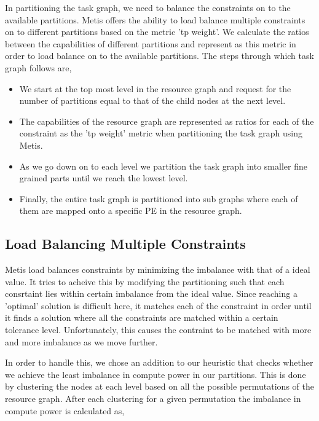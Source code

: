 In partitioning the task graph, we need to balance the constraints on
to the available partitions. Metis offers the ability to load balance
multiple constraints on to different partitions based on the metric 'tp
weight'. We calculate the ratios between the capabilities of different
partitions and represent as this metric in order to load balance on to
the available partitions. The steps through which task graph follows
are,

\begin{itemize}

\item We start at the top most level in the resource graph and request
for the number of partitions equal to that of the child nodes at the
next level.

\item The capabilities of the resource graph are represented as ratios
for each of the constraint as the 'tp weight' metric when partitioning
the task graph using Metis.

\item As we go down on to each level we partition the task graph into
smaller fine grained parts until we reach the lowest level.

\item Finally, the entire task graph is partitioned into sub graphs
where each of them are mapped onto a specific PE in the resource graph.

\end{itemize}

\subsection{Load Balancing Multiple Constraints}

Metis load balances constraints by minimizing the imbalance with that
of a ideal value. It tries to acheive this by modifying the
partitioning such that each consrtaint lies within certain imbalance
from the ideal value. Since reaching a 'optimal' solution is difficult
here, it matches each of the constraint in order until it finds a
solution where all the constraints are matched within a certain
tolerance level. Unfortunately, this causes the contraint to be
matched with more and more imbalance as we move further.

In order to handle this, we chose an addition to our heuristic that
checks whether we achieve the least imbalance in compute power in our
partitions. This is done by clustering the nodes at each level based
on all the possible permutations of the resource graph. After each
clustering for a given permutation the imbalance in compute power is
calculated as,

